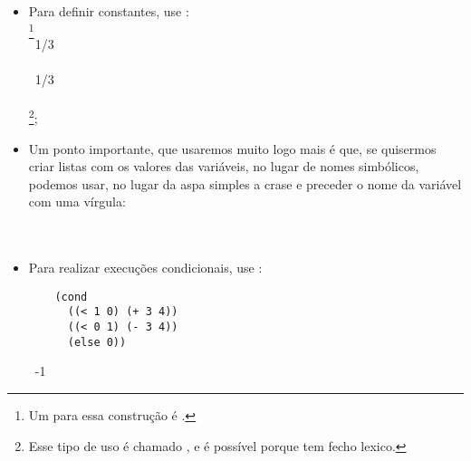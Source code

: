 \begin{itemize}
{    ter fórmulas crescendo linearmente na horizontal (note que o
    ``chapéu'' faz com que a fórmula cresça para cima'), então decidiu
    mover o chapéu para o lado, obtendo .
    Mas o chapéu flutuando parece engraçado, então Church o trocou
    pelo  o símbolo não usado mais próximo que tinha, um $\Lambda$, como em
    . Mas
    $\Lambda$ tem uma grafia muito parecida com outra letra comum, o que foi
    percebido como um incoveniente, então ele acabou eventualmente
    trocando para $\lambda$ em sua teoria, que acabou se chamando
     \cite{norvig}.}:\\
   \seta\ 1/3n

\item Para definir constantes, use :\\
  \footnote{Um
     para essa construção é
    .}\\
   \seta\ 1/3\\
  \\
   \seta\ 1/3\\
  \\
   \footnote{Esse tipo de uso é chamado
    , e é possível porque  tem
    fecho lexico.};

\item  Um ponto importante, que usaremos muito logo mais é que, se
  quisermos criar listas com os valores das variáveis, no lugar de
  nomes simbólicos, podemos usar, no lugar da aspa simples a crase e
  preceder o nome da variável com uma vírgula:\\
  \\
   \seta\ 

\item Para realizar execuções condicionais, use :\\
  \begin{lstlisting}
    (cond
      ((< 1 0) (+ 3 4))
      ((< 0 1) (- 3 4))
      (else 0))
  \end{lstlisting}
  \hspace{1cm} \seta\ -1\\
  

\end{itemize}
